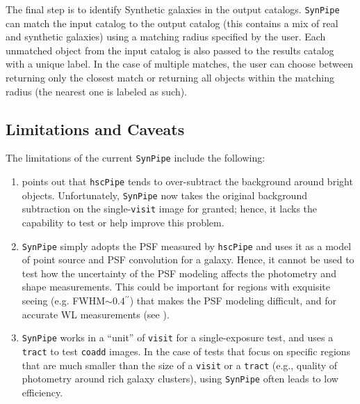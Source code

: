 \documentclass[useamsfonts]{pasj01}
\def\asec{$^{\prime\prime}$}
\def\hscpipe{\texttt{hscPipe}}
\def\synpipe{\texttt{SynPipe}}
\def\coadd{\texttt{coadd}}
\def\tract{\texttt{tract}}
\def\visit{\texttt{visit}}
\begin{document}
    The final step is to identify Synthetic galaxies in the output catalogs. 
    \synpipe{} can match the input catalog to the output catalog (this contains a mix 
    of real and synthetic galaxies) using a matching radius specified by the user.
    Each unmatched object from the input catalog is also passed to the results catalog
    with a unique label.
    In the case of multiple matches, the user can choose between returning only the
    closest match or returning all objects within the matching radius (the nearest one
    is labeled as such).

\subsection{Limitations and Caveats}
    \label{ssec:caveats}
    
    The limitations of the current \synpipe{} include the following:

    \begin{enumerate}

        \item \citet{HSCDR1} points out that \hscpipe{} tends to over-subtract the
            background around bright objects.
            Unfortunately, \synpipe{} now takes the original background subtraction on
            the single-\visit{} image for granted; hence, it lacks the capability to
            test or help improve this problem.

        \item  \synpipe{} simply adopts the PSF measured by \hscpipe{} and
            uses it as a model of point source and PSF convolution for a galaxy.
            Hence, it cannot be used to test how the uncertainty of the PSF modeling
            affects the photometry and shape measurements.
            This could be important for regions with exquisite seeing 
            (e.g. FWHM${\sim}0.4$\asec{}) that makes the
            PSF modeling difficult, and for accurate WL measurements 
            (see \citealt{HSCDR1}).

        \item \synpipe{} works in a ``unit'' of \visit{} for a single-exposure
            test, and uses a \tract{} to test \coadd{} images.
            In the case of tests that focus on specific regions that are much smaller 
            than the size of a \visit{} or a \tract{} (e.g., quality of photometry
            around rich galaxy clusters), using \synpipe{} often leads to
            low efficiency.

    \end{enumerate}
\end{document}
